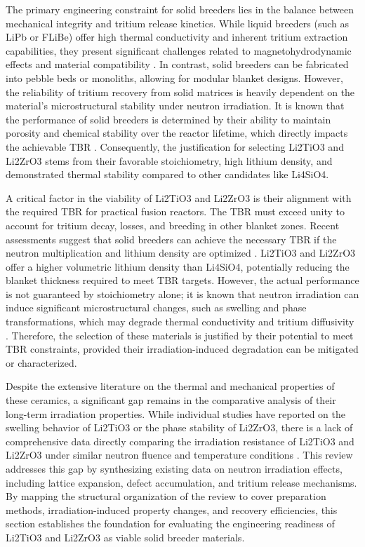 \documentclass[review,12pt,a4paper]{elsarticle}
\begin{document}
\textcolor{highconf}{The primary engineering constraint for solid breeders lies in the balance between mechanical integrity and tritium release kinetics. While liquid breeders (such as LiPb or FLiBe) offer high thermal conductivity and inherent tritium extraction capabilities, they present significant challenges related to magnetohydrodynamic effects and material compatibility \citep{zhao_burnup_2013}. In contrast, solid breeders can be fabricated into pebble beds or monoliths, allowing for modular blanket designs. However, the reliability of tritium recovery from solid matrices is heavily dependent on the material's microstructural stability under neutron irradiation. It is known that the performance of solid breeders is determined by their ability to maintain porosity and chemical stability over the reactor lifetime, which directly impacts the achievable TBR \citep{zhao_burnup_2013}. Consequently, the justification for selecting Li2TiO3 and Li2ZrO3 stems from their favorable stoichiometry, high lithium density, and demonstrated thermal stability compared to other candidates like Li4SiO4.}

\textcolor{medconf}{A critical factor in the viability of Li2TiO3 and Li2ZrO3 is their alignment with the required TBR for practical fusion reactors. The TBR must exceed unity to account for tritium decay, losses, and breeding in other blanket zones. Recent assessments suggest that solid breeders can achieve the necessary TBR if the neutron multiplication and lithium density are optimized \citep{zhao_burnup_2013}. Li2TiO3 and Li2ZrO3 offer a higher volumetric lithium density than Li4SiO4, potentially reducing the blanket thickness required to meet TBR targets. However, the actual performance is not guaranteed by stoichiometry alone; it is known that neutron irradiation can induce significant microstructural changes, such as swelling and phase transformations, which may degrade thermal conductivity and tritium diffusivity \citep{zhao_burnup_2013}. Therefore, the selection of these materials is justified by their potential to meet TBR constraints, provided their irradiation-induced degradation can be mitigated or characterized.}

\textcolor{highconf}{Despite the extensive literature on the thermal and mechanical properties of these ceramics, a significant gap remains in the comparative analysis of their long-term irradiation properties. While individual studies have reported on the swelling behavior of Li2TiO3 or the phase stability of Li2ZrO3, there is a lack of comprehensive data directly comparing the irradiation resistance of Li2TiO3 and Li2ZrO3 under similar neutron fluence and temperature conditions \citep{zhao_burnup_2013}. This review addresses this gap by synthesizing existing data on neutron irradiation effects, including lattice expansion, defect accumulation, and tritium release mechanisms. By mapping the structural organization of the review to cover preparation methods, irradiation-induced property changes, and recovery efficiencies, this section establishes the foundation for evaluating the engineering readiness of Li2TiO3 and Li2ZrO3 as viable solid breeder materials.}
\end{document}
